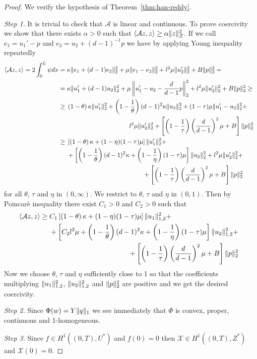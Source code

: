 \documentclass[a4paper,10pt,twoside]{amsbook}
\numberwithin{section}{chapter}
\numberwithin{equation}{chapter}
\theoremstyle{definition}
\DeclarePairedDelimiter{\norm}{\lVert}{\rVert}
\DeclarePairedDelimiter{\dual}{\langle}{\rangle}
\begin{document}
\begin{proof}
We verify the hypothesis of Theorem~\ref{thm:han-reddy}.

\emph{Step 1.} It is trivial to check that $\mathcal{A}$ is linear and continuous. To prove coercivity we show that there exists $\alpha>0$ such that $\dual{\mathcal{A}z,z}\ge\alpha\norm{z}_{Z}^2$. If we call $e_1=u_1'-p$ and $e_2=u_2+(d-1)^{-1}p$ we have by applying Young inequality repeatedly
\[
\begin{split}
\dual{\mathcal{A}z,z}=2\int_0^L\psi dx&=\kappa\norm{e_1+(d-1)e_2}_2^2+\mu\norm{e_1-e_2}_2^2+l^2\mu\norm{u_2'}_2^2+B\norm{p}_2^2=\\
&=\kappa\norm{u_1'+(d-1)u_2}_2^2+\mu\left\lVert u_1'-u_2-\frac{d}{d-1}p\right\rVert_2^2+l^2\mu\norm{u_2'}_2^2+B\norm{p}_2^2\ge\\
&\ge\begin{multlined}[t]
\left(1-\theta\right)\kappa\norm{u_1'}_2^2+\left(1-\frac{1}{\theta}\right)(d-1)^2\kappa\norm{u_2}_2^2+(1-\tau)\mu\norm{u_1'-u_2}_2^2+\\
l^2\mu\norm{u_2'}_2^2+\left[\left(1-\frac{1}{\tau}\right)\left(\frac{d}{d-1}\right)^2\mu+B\right]\norm{p}_2^2
\end{multlined}\\
&\ge
\begin{multlined}[t]
\left[\left(1-\theta\right)\kappa+(1-\eta)(1-\tau)\mu\right]\norm{u_1'}_2^2+\\
+\left[\left(1-\frac{1}{\theta}\right)(d-1)^2\kappa+\left(1-\frac{1}{\eta}\right)(1-\tau)\mu\right]\norm{u_2}_2^2+l^2\mu\norm{u_2'}_2^2+\\
+\left[\left(1-\frac{1}{\tau}\right)\left(\frac{d}{d-1}\right)^2\mu+B\right]\norm{p}_2^2
\end{multlined}
\end{split}
\]
for all $\theta$, $\tau$ and $\eta$ in $(0,\infty)$. We restrict to $\theta$, $\tau$ and $\eta$ in $(0,1)$. Then by Poincarè inequality there exist $C_1>0$ and $C_2>0$ such that
\[
\begin{split}
\dual{\mathcal{A}z,z}\ge
\begin{multlined}[t]
C_1\left[\left(1-\theta\right)\kappa+(1-\eta)(1-\tau)\mu\right]\norm{u_1}_{1,2}^2+\\
+\left[C_2l^2\mu+\left(1-\frac{1}{\theta}\right)(d-1)^2\kappa+\left(1-\frac{1}{\eta}\right)(1-\tau)\mu\right]\norm{u_2}_{1,2}^2+\\
+\left[\left(1-\frac{1}{\tau}\right)\left(\frac{d}{d-1}\right)^2\mu+B\right]\norm{p}_2^2
\end{multlined}
\end{split}
\]
Now we choose $\theta$, $\tau$ and $\eta$ sufficiently close to 1 so that the coefficients multiplying $\norm{u_1}_{1,2}^2$, $\norm{u_2}_{1,2}^2$ and $\norm{p}_2^2$ are positive and we get the desired coercivity.

\emph{Step 2.} Since $\Phi(w)=Y\norm{q}_1$ we see immediately that $\Phi$ is convex, proper, continuous and 1-homogeneous.

\emph{Step 3.} Since $f\in H^1((0,T),U^*)$ and $f(0)=0$ then $\mathcal{X}\in H^1((0,T),Z^*)$ and $\mathcal{X}(0)=0$.
\end{proof}
\end{document}
